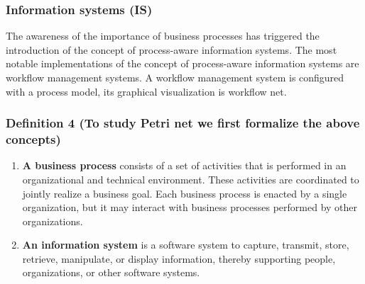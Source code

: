 \documentclass[a4paper]{article}
\begin{document}
\subsubsection{Information systems (IS)}
The awareness of the importance of business processes has triggered the introduction of the 
concept of process-aware information systems. The most notable implementations of the concept 
of process-aware information systems are workflow management systems. A workflow management 
system is configured with a process model, its graphical visualization is workflow net.
\subsubsection{Definition 4 (To study Petri net we first formalize the above concepts)} 
\begin{enumerate}
    \item \textbf{A business process} consists of a set of activities that is performed in an organizational and technical environment. These activities are coordinated to jointly realize a business goal. Each business process is enacted by a single organization, but it may interact with business processes performed by other organizations.
    \item \textbf{An information system} is a software system to capture, transmit, store, retrieve, manipulate, or display information, thereby supporting people, organizations, or other software systems.
\end{enumerate}
\par\null\par
\end{document}
